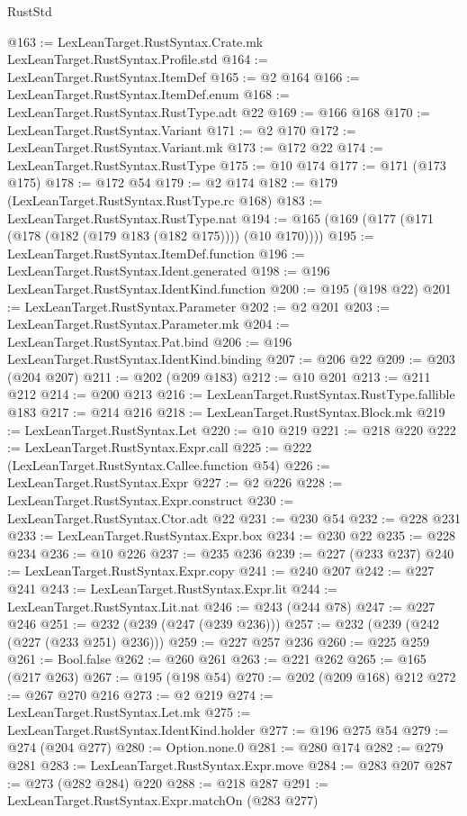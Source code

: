 \begin{lexlean}{RustStd}
\begin{coremodule}
@163 := LexLeanTarget.RustSyntax.Crate.mk LexLeanTarget.RustSyntax.Profile.std
@164 := LexLeanTarget.RustSyntax.ItemDef
@165 := @2 @164
@166 := LexLeanTarget.RustSyntax.ItemDef.enum
@168 := LexLeanTarget.RustSyntax.RustType.adt @22
@169 := @166 @168
@170 := LexLeanTarget.RustSyntax.Variant
@171 := @2 @170
@172 := LexLeanTarget.RustSyntax.Variant.mk
@173 := @172 @22
@174 := LexLeanTarget.RustSyntax.RustType
@175 := @10 @174
@177 := @171 (@173 @175)
@178 := @172 @54
@179 := @2 @174
@182 := @179 (LexLeanTarget.RustSyntax.RustType.rc @168)
@183 := LexLeanTarget.RustSyntax.RustType.nat
@194 := @165 (@169 (@177 (@171 (@178 (@182 (@179 @183 (@182 @175)))) (@10 @170))))
@195 := LexLeanTarget.RustSyntax.ItemDef.function
@196 := LexLeanTarget.RustSyntax.Ident.generated
@198 := @196 LexLeanTarget.RustSyntax.IdentKind.function
@200 := @195 (@198 @22)
@201 := LexLeanTarget.RustSyntax.Parameter
@202 := @2 @201
@203 := LexLeanTarget.RustSyntax.Parameter.mk
@204 := LexLeanTarget.RustSyntax.Pat.bind
@206 := @196 LexLeanTarget.RustSyntax.IdentKind.binding
@207 := @206 @22
@209 := @203 (@204 @207)
@211 := @202 (@209 @183)
@212 := @10 @201
@213 := @211 @212
@214 := @200 @213
@216 := LexLeanTarget.RustSyntax.RustType.fallible @183
@217 := @214 @216
@218 := LexLeanTarget.RustSyntax.Block.mk
@219 := LexLeanTarget.RustSyntax.Let
@220 := @10 @219
@221 := @218 @220
@222 := LexLeanTarget.RustSyntax.Expr.call
@225 := @222 (LexLeanTarget.RustSyntax.Callee.function @54)
@226 := LexLeanTarget.RustSyntax.Expr
@227 := @2 @226
@228 := LexLeanTarget.RustSyntax.Expr.construct
@230 := LexLeanTarget.RustSyntax.Ctor.adt @22
@231 := @230 @54
@232 := @228 @231
@233 := LexLeanTarget.RustSyntax.Expr.box
@234 := @230 @22
@235 := @228 @234
@236 := @10 @226
@237 := @235 @236
@239 := @227 (@233 @237)
@240 := LexLeanTarget.RustSyntax.Expr.copy
@241 := @240 @207
@242 := @227 @241
@243 := LexLeanTarget.RustSyntax.Expr.lit
@244 := LexLeanTarget.RustSyntax.Lit.nat
@246 := @243 (@244 @78)
@247 := @227 @246
@251 := @232 (@239 (@247 (@239 @236)))
@257 := @232 (@239 (@242 (@227 (@233 @251) @236)))
@259 := @227 @257 @236
@260 := @225 @259
@261 := Bool.false
@262 := @260 @261
@263 := @221 @262
@265 := @165 (@217 @263)
@267 := @195 (@198 @54)
@270 := @202 (@209 @168) @212
@272 := @267 @270 @216
@273 := @2 @219
@274 := LexLeanTarget.RustSyntax.Let.mk
@275 := LexLeanTarget.RustSyntax.IdentKind.holder
@277 := @196 @275 @54
@279 := @274 (@204 @277)
@280 := Option.none.{0}
@281 := @280 @174
@282 := @279 @281
@283 := LexLeanTarget.RustSyntax.Expr.move
@284 := @283 @207
@287 := @273 (@282 @284) @220
@288 := @218 @287
@291 := LexLeanTarget.RustSyntax.Expr.matchOn (@283 @277)

\end{coremodule}
\end{lexlean}
